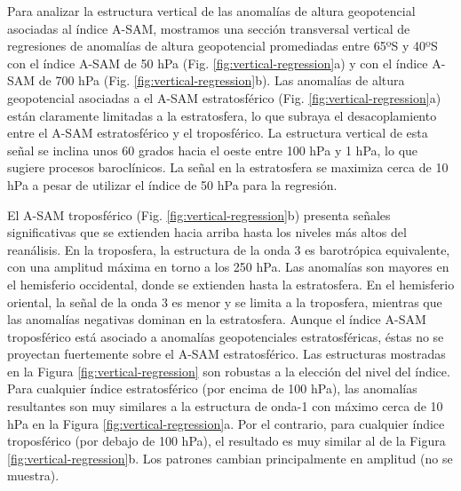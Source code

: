 \documentclass[12pt,oneside,a4paper]{reedthesis}
\begin{document}
Para analizar la estructura vertical de las anomalías de altura geopotencial asociadas al índice A-SAM, mostramos una sección transversal vertical de regresiones de anomalías de altura geopotencial promediadas entre 65ºS y 40ºS con el índice A-SAM de 50 hPa (Fig. \ref{fig:vertical-regression}a) y con el índice A-SAM de 700 hPa (Fig. \ref{fig:vertical-regression}b).
Las anomalías de altura geopotencial asociadas a el A-SAM estratosférico (Fig. \ref{fig:vertical-regression}a) están claramente limitadas a la estratosfera, lo que subraya el desacoplamiento entre el A-SAM estratosférico y el troposférico.
La estructura vertical de esta señal se inclina unos 60 grados hacia el oeste entre 100 hPa y 1 hPa, lo que sugiere procesos baroclínicos.
La señal en la estratosfera se maximiza cerca de 10 hPa a pesar de utilizar el índice de 50 hPa para la regresión.

El A-SAM troposférico (Fig. \ref{fig:vertical-regression}b) presenta señales significativas que se extienden hacia arriba hasta los niveles más altos del reanálisis.
En la troposfera, la estructura de la onda 3 es barotrópica equivalente, con una amplitud máxima en torno a los 250 hPa.
Las anomalías son mayores en el hemisferio occidental, donde se extienden hasta la estratosfera.
En el hemisferio oriental, la señal de la onda 3 es menor y se limita a la troposfera, mientras que las anomalías negativas dominan en la estratosfera.
Aunque el índice A-SAM troposférico está asociado a anomalías geopotenciales estratosféricas, éstas no se proyectan fuertemente sobre el A-SAM estratosférico.
Las estructuras mostradas en la Figura \ref{fig:vertical-regression} son robustas a la elección del nivel del índice.
Para cualquier índice estratosférico (por encima de 100 hPa), las anomalías resultantes son muy similares a la estructura de onda-1 con máximo cerca de 10 hPa en la Figura \ref{fig:vertical-regression}a.
Por el contrario, para cualquier índice troposférico (por debajo de 100 hPa), el resultado es muy similar al de la Figura \ref{fig:vertical-regression}b.
Los patrones cambian principalmente en amplitud (no se muestra).
\end{document}
